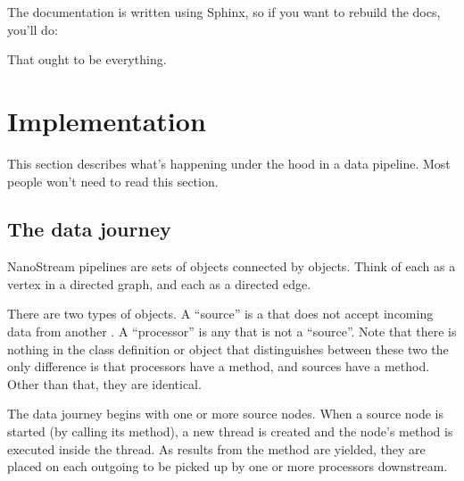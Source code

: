 \documentclass[letterpaper,10pt,english]{sphinxmanual}
\begin{document}

The documentation is written using Sphinx, so if you want to rebuild the docs,
you’ll do:


That ought to be everything.


\chapter{Implementation}
\label{\detokenize{implementation:implementation}}\label{\detokenize{implementation::doc}}
This section describes what’s happening under the hood in a 
data pipeline. Most people won’t need to read this section.


\section{The data journey}
\label{\detokenize{implementation:the-data-journey}}
NanoStream pipelines are sets of  objects connected by 
objects. Think of each  as a vertex in a directed graph, and each
 as a directed edge.

There are two types of  objects. A “source” is a  that does not accept incoming data from another . A “processor” is any  that is not a “source”. Note that there is nothing in the class definition or object that distinguishes between these two \textendash{} the only
difference is that processors have a  method, and sources have a  method. Other than that, they are identical.

The data journey begins with one or more source nodes. When a source node is started (by calling its  method), a new thread is created and the node’s  method is executed inside the thread. As results from the  method are yielded, they are placed on each outgoing  to be picked up by one or more processors downstream.
\end{document}
